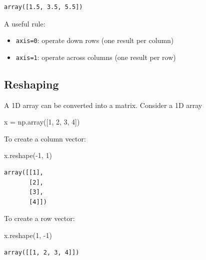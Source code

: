 \documentclass[
  letterpaper,
  DIV=11,
  numbers=noendperiod]{scrreprt}
\newenvironment{Shaded}{\begin{snugshade}}{\end{snugshade}}
\newcommand{\DecValTok}[1]{\textcolor[rgb]{0.68,0.00,0.00}{#1}}
\newcommand{\NormalTok}[1]{\textcolor[rgb]{0.00,0.23,0.31}{#1}}
\newcommand{\OperatorTok}[1]{\textcolor[rgb]{0.37,0.37,0.37}{#1}}
\providecommand{\tightlist}{%
  \setlength{\itemsep}{0pt}\setlength{\parskip}{0pt}}
\theoremstyle{definition}
\theoremstyle{definition}
\theoremstyle{plain}
\theoremstyle{plain}
\theoremstyle{remark}
\begin{document}
\begin{verbatim}
array([1.5, 3.5, 5.5])
\end{verbatim}

A useful rule:

\begin{itemize}
\tightlist
\item
  \texttt{axis=0}: operate down rows (one result per column)
\item
  \texttt{axis=1}: operate across columns (one result per row)
\end{itemize}

\subsection{Reshaping}\label{reshaping}

A 1D array can be converted into a matrix. Consider a 1D array

\begin{Shaded}
\begin{Highlighting}[]
\NormalTok{x }\OperatorTok{=}\NormalTok{ np.array([}\DecValTok{1}\NormalTok{, }\DecValTok{2}\NormalTok{, }\DecValTok{3}\NormalTok{, }\DecValTok{4}\NormalTok{])}
\end{Highlighting}
\end{Shaded}

To create a column vector:

\begin{Shaded}
\begin{Highlighting}[]
\NormalTok{x.reshape(}\OperatorTok{{-}}\DecValTok{1}\NormalTok{, }\DecValTok{1}\NormalTok{)}
\end{Highlighting}
\end{Shaded}

\begin{verbatim}
array([[1],
       [2],
       [3],
       [4]])
\end{verbatim}

To create a row vector:

\begin{Shaded}
\begin{Highlighting}[]
\NormalTok{x.reshape(}\DecValTok{1}\NormalTok{, }\OperatorTok{{-}}\DecValTok{1}\NormalTok{)}
\end{Highlighting}
\end{Shaded}

\begin{verbatim}
array([[1, 2, 3, 4]])
\end{verbatim}
\end{document}
